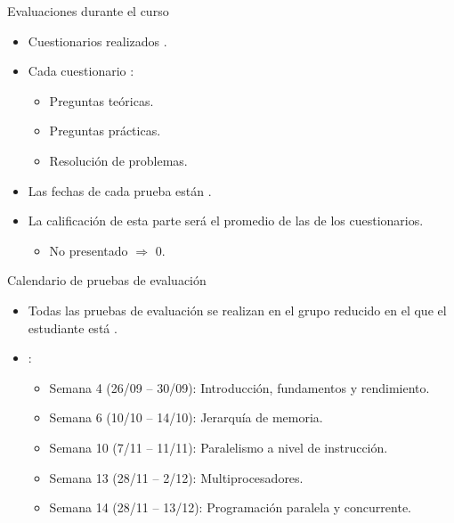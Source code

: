 \begin{frame}[t]{Evaluaciones durante el curso}
\begin{itemize}
  \item Cuestionarios realizados .

  \item Cada cuestionario :
    \begin{itemize}
      \item Preguntas teóricas.
      \item Preguntas prácticas.
      \item Resolución de problemas.
    \end{itemize}

  \item Las fechas de cada prueba están .

  \item La calificación de esta parte será el promedio de las 
        de los cuestionarios. 
    \begin{itemize}
      \item No presentado $\Rightarrow$ 0.
    \end{itemize}
\end{itemize}
\end{frame}

\begin{frame}[t]{Calendario de pruebas de evaluación}
\begin{itemize}
  \item Todas las pruebas de evaluación se realizan en el grupo reducido
        en el que el estudiante está .

  \vfill
  \item {}:
  \begin{itemize}
    \item Semana 4 (26/09 -- 30/09): Introducción, fundamentos y rendimiento.
    \item Semana 6 (10/10 -- 14/10): Jerarquía de memoria.
    \item Semana 10 (7/11 -- 11/11): Paralelismo a nivel de instrucción.
    \item Semana 13 (28/11 -- 2/12): Multiprocesadores.
    \item Semana 14 (28/11 -- 13/12): Programación paralela y concurrente.
  \end{itemize}
\end{itemize}
\end{frame}


